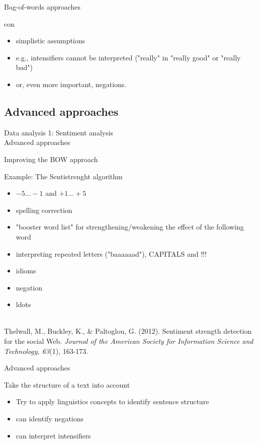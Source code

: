 \documentclass{beamer}
\begin{document}
\begin{frame}{Bag-of-words approaches}
\begin{block}{con}
\begin{itemize}
\item simplistic assumptions
\item e.g., intensifiers cannot be interpreted ("really" in "really good" or "really bad")
\item or, even more important, negations.
\end{itemize}
\end{block}
\end{frame}



\subsection{Advanced approaches}
\begin{frame}
Data analysis 1: Sentiment analysis\\
Advanced approaches
\end{frame}


\begin{frame}{Improving the BOW approach}
\begin{block}{Example: The Sentistrenght algorithm}
\begin{itemize}
\item $-5\ldots-1$ and $+1\ldots+5$
\item spelling correction
\item "booster word list" for strengthening/weakening the effect of the following word
\item interpreting repeated letters ("baaaaaad"), CAPITALS and !!!
\item idioms
\item negation 
\item ldots
\end{itemize}
\end{block}
~ \\
\tiny{Thelwall, M., Buckley, K., \& Paltoglou, G. (2012). Sentiment strength detection for the social Web. \emph{Journal of the American Society for Information Science and Technology, 63}(1), 163-173.\\}
\end{frame}


\begin{frame}{Advanced approaches}
\begin{block}{Take the structure of a text into account}
\begin{itemize}
\item Try to apply linguistics concepts to identify sentence structure
\item can identify negations
\item can interpret intensifiers
\end{itemize}
\end{block}
\end{frame}
\end{document}
